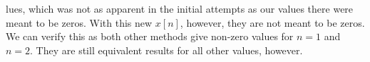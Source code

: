 \documentclass[12pt]{article}
\begin{document}
\begin{enumerate}[label=\textbf{\alph*)}, leftmargin=2.6em]
lues, which was not as apparent in the initial attempts as our values there were meant to be zeros. With this new $x[n]$, however, they are not meant to be zeros. We can verify this as both other methods give non-zero values for $n=1$ and $n=2$. They are still equivalent results for all other values, however.
\begin{figure} [H]
    \centerin
\end{figure}
\end{enumerate}
\end{document}
